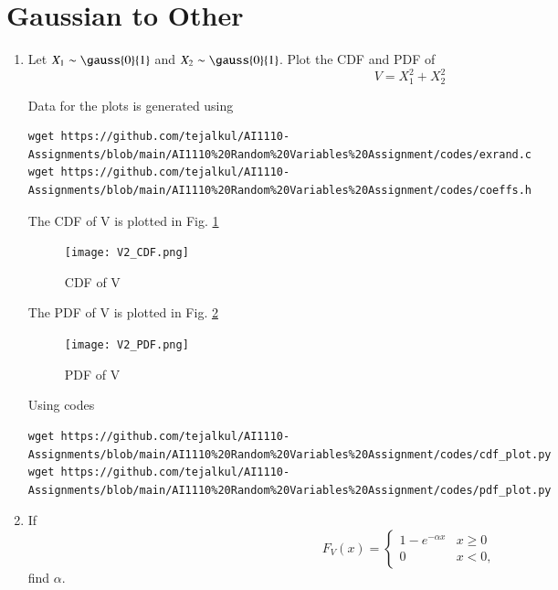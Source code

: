 \documentclass[journal,12pt,twocolumn]{IEEEtran}
\renewcommand\thesection{\arabic{section}}
\begin{document}
\section{Gaussian to Other}
\begin{enumerate}[label=\thesection.\arabic*
,ref=\thesection.\theenumi]
\item
Let $X_1 \sim  \gauss{0}{1}$ and $X_2 \sim  \gauss{0}{1}$. Plot the CDF and PDF of
%
\begin{equation}
V = X_1^2 + X_2^2
\end{equation}

\solution
Data for the plots is generated using
\begin{lstlisting}
wget https://github.com/tejalkul/AI1110-Assignments/blob/main/AI1110%20Random%20Variables%20Assignment/codes/exrand.c
wget https://github.com/tejalkul/AI1110-Assignments/blob/main/AI1110%20Random%20Variables%20Assignment/codes/coeffs.h
\end{lstlisting}
The CDF of V is plotted in Fig. \ref{Fig:chi_cdf} 
\begin{figure}[!ht]
\texttt{[image: V2\_CDF.png]}
\caption{CDF of V}
\label{Fig:chi_cdf}
\end{figure}

The PDF of V is plotted in Fig. \ref{Fig:chi_pdf} 

\begin{figure}[!ht]
\texttt{[image: V2\_PDF.png]}
\caption{PDF of V}
\label{Fig:chi_pdf}
\end{figure} 

Using codes
\begin{lstlisting}
wget https://github.com/tejalkul/AI1110-Assignments/blob/main/AI1110%20Random%20Variables%20Assignment/codes/cdf_plot.py
wget https://github.com/tejalkul/AI1110-Assignments/blob/main/AI1110%20Random%20Variables%20Assignment/codes/pdf_plot.py
\end{lstlisting}
%
%
%
\item
If
%
\begin{equation}
F_{V}(x) = 
\begin{cases}
1 - e^{-\alpha x} & x \geq 0 \\
0 & x < 0,
\end{cases}
\end{equation}
%
find $\alpha$.
%


\end{enumerate}
\end{document}
